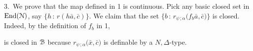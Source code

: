 \documentclass{amsproc}
\makeatletter
\def\U{\EuScript U}
\def\B{\EuScript B}
\def\N{\EuScript N}
\def\phi{\varphi}
\theoremstyle{mio}
\providecommand{\proofNameStyle}{\bfseries}
\renewenvironment{proof}[1][\proofname]{\par
  \pushQED{\qed}%
  \normalfont%
  \trivlist
  \item[\hskip\labelsep
        \proofNameStyle
    #1\@addpunct{.}]\ignorespaces
}{%
  \popQED\endtrivlist\@endpefalse
}
\makeatother
\begin{document}
\begin{proof}

  3.\ 
  We prove that the map defined in 1 is continuous.
  Pick any basic closed set in ${\rm End}(\N)$, say $\big\{ h\, :\, r(h\bar a,\bar c)\big\}$.
  We claim that the set $\big\{b\, :\, r_{\psi\,;\alpha}(f_b\bar a,\bar c\big)\}$ is closed. Indeed, by the definition of $f_b$ in 1,


  is closed in $\B$ because $r_{\psi\,;\alpha}\big(\bar x,\bar c\big)$ is definable by a $N,\Delta$-type.
\end{proof}




% 




\end{document}
